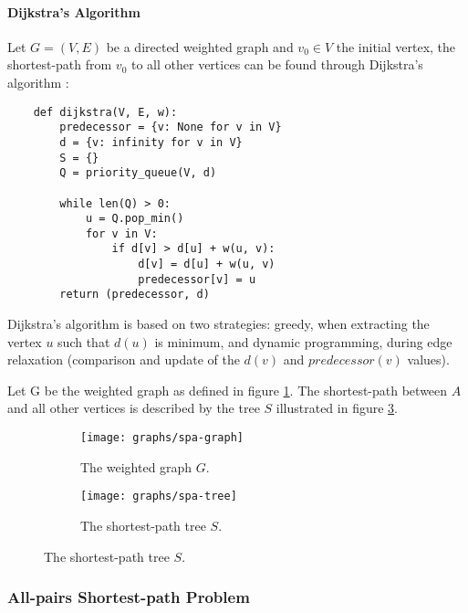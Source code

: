 \paragraph{Dijkstra's Algorithm}

Let $G=(V, E)$ be a directed weighted graph and $v_0 \in V$ the initial vertex, the shortest-path from $v_0$ to all other vertices can be found through Dijkstra's algorithm \cite{cor2011}:
\begin{verbatim}
    def dijkstra(V, E, w):
        predecessor = {v: None for v in V}
        d = {v: infinity for v in V}
        S = {}
        Q = priority_queue(V, d)
	
        while len(Q) > 0:
            u = Q.pop_min()
            for v in V:
                if d[v] > d[u] + w(u, v):
                    d[v] = d[u] + w(u, v)
                    predecessor[v] = u
        return (predecessor, d)
\end{verbatim}

\begin{remark}
	Dijkstra's algorithm is based on two strategies: greedy, when extracting the vertex $u$ such that $d(u)$ is minimum, and dynamic programming, during edge relaxation (comparison and update of the $d(v)$ and $predecessor(v)$ values).
\end{remark}

\begin{example}
	Let G be the weighted graph as defined in figure \ref{fig:spa-graph}. The shortest-path between $A$ and all other vertices is described by the tree $S$ illustrated in figure \ref{fig:spa-tree}.

	\begin{figure}[H]
		\centering
		\begin{subfigure}{.4\linewidth}
			\texttt{[image: graphs/spa-graph]}
			\captionsetup{justification=centering}
			\caption{The weighted graph $G$.}
			\label{fig:spa-graph}
		\end{subfigure}
		\begin{subfigure}{.4\linewidth}
			\texttt{[image: graphs/spa-tree]}
			\captionsetup{justification=centering}
			\caption{The shortest-path tree $S$.}
			\label{fig:spa-tree}
		\end{subfigure}
	\end{figure}
\end{example}

\subsubsection{All-pairs Shortest-path Problem}

